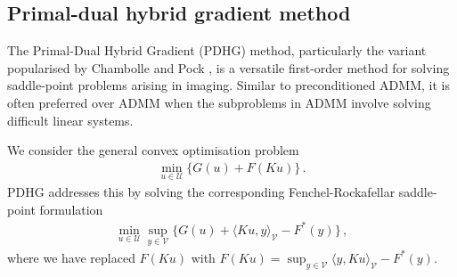 \subsection{Primal-dual hybrid gradient method}\label{sec:pdhg}

The Primal-Dual Hybrid Gradient (PDHG) method, particularly the variant popularised by Chambolle and Pock \cite{Chambolle2011PDHG, Pock2009PDHG}, is a versatile first-order method for solving saddle-point problems arising in imaging. Similar to preconditioned ADMM, it is often preferred over ADMM when the subproblems in ADMM involve solving difficult linear systems.

\noindent We consider the general convex optimisation problem
\begin{align*}
\min_{u \in \mathcal{U}} \{ G(u) + F(Ku) \} \, .
\end{align*}
PDHG addresses this by solving the corresponding Fenchel-Rockafellar saddle-point formulation
\begin{align}
\min_{u \in \mathcal{U}} \sup_{y \in \mathcal{V}} \{ G(u) + \langle Ku, y \rangle_\mathcal{V} - F^*(y) \} \, , \label{eq:pdhg_saddle_point}
\end{align}
where we have replaced $F(Ku)$ with $F(Ku) = \sup_{y \in \mathcal{V}} \langle y, Ku \rangle_{\mathcal{V}} - F^\ast(y)$.


